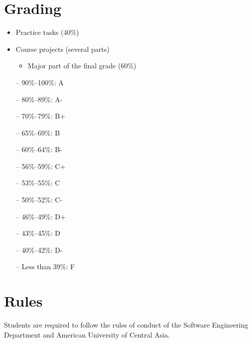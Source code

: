 \documentclass[12pt,a4paper,oneside]{article}
\begin{document}
    \section{Grading}

        \begin{itemize}
            \item Practice tasks (40\%)
            \item Course projects (several parts)
            \begin{itemize}
                \item Major part of the final grade (60\%)
            \end{itemize}
        \end{itemize}

        \begin{itemize} \itemsep-10pt \parskip0pt 
            \item[--] 90\%--100\%: A\\
            \item[--] 80\%--89\%: A-\\
            \item[--] 70\%--79\%: B+\\
            \item[--] 65\%--69\%: B\\
            \item[--] 60\%--64\%: B-\\
            \item[--] 56\%--59\%: C+\\
            \item[--] 53\%--55\%: C\\
            \item[--] 50\%--52\%: C-\\
            \item[--] 46\%--49\%: D+\\
            \item[--] 43\%--45\%: D\\
            \item[--] 40\%--42\%: D-\\
            \item[--] Less than 39\%: F
        \end{itemize}

    \section{Rules}

        Students are required to follow the rules of conduct of the Software Engineering Department and American University of Central Asia.
\end{document}
